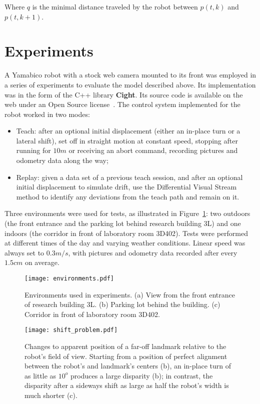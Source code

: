 \documentclass[twocolumn, 9pt,fleqn]{jsproceedings}
\begin{document}
Where $q$ is the minimal distance traveled by the robot between $p(t, k)$ and $p(t, k+1)$.

\section{Experiments}

A Yamabico robot with a stock web camera mounted to its front was employed in a series of experiments to evaluate the model described above. Its implementation was in the form of the C++ library \textbf{Cight}. Its source code is available on the web under an Open Source license~\cite{HEL14c}. The control system implemented for the robot worked in two modes:

\begin{itemize}
\item Teach: after an optional initial displacement (either an in-place turn or a lateral shift), set off in straight motion at constant speed, stopping after running for $10m$ or receiving an abort command, recording pictures and odometry data along the way;
\item Replay: given a data set of a previous teach session, and after an optional initial displacement to simulate drift, use the Differential Visual Stream method to identify any deviations from the teach path and remain on it.
\end{itemize}

Three environments were used for tests, as illustrated in Figure~\ref{fig:environments}: two outdoors (the front entrance and the parking lot behind research building 3L) and one indoors (the corridor in front of laboratory room 3D402). Tests were performed at different times of the day and varying weather conditions. Linear speed was always set to $0.3m/s$, with pictures and odometry data recorded after every $1.5cm$ on average.

\begin{figure}[h!]
\texttt{[image: environments.pdf]}
\caption{Environments used in experiments. (a) View from the front entrance of research building 3L. (b) Parking lot behind the building. (c) Corridor in front of laboratory room 3D402.}
\label{fig:environments}
\end{figure}

\begin{figure}[h!]
\texttt{[image: shift\_problem.pdf]}
\caption{Changes to apparent position of a far-off landmark relative to the robot's field of view. Starting from a position of perfect alignment between the robot's and landmark's centers (b), an in-place turn of as little as $10^o$ produces a large disparity (b); in contrast, the disparity after a sideways shift as large as half the robot's width is much shorter (c).}
\label{fig:shift_problem}
\end{figure}
\end{document}
